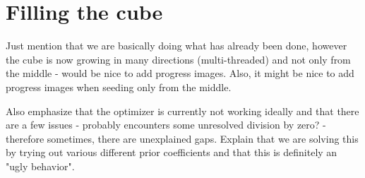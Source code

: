 \section{Filling the cube}
Just mention that we are basically doing what has already been done, however the cube is now growing in many directions (multi-threaded) and not only from the middle - would be nice to add progress images. Also, it might be nice to add progress images when seeding only from the middle.

Also emphasize that the optimizer is currently not working ideally and that there are a few issues - probably encounters some unresolved division by zero? - therefore sometimes, there are unexplained gaps. Explain that we are solving this by trying out various different prior coefficients and that this is definitely an "ugly behavior".